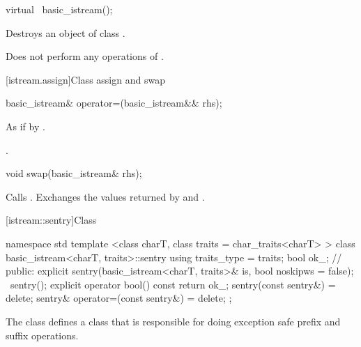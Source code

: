 %
\begin{itemdecl}
virtual ~basic_istream();
\end{itemdecl}

\begin{itemdescr}
\pnum
\effects
Destroys an object of class
.

\pnum
\remarks
Does not perform any operations of
.
\end{itemdescr}

[istream.assign]{Class  assign and swap}

%
\begin{itemdecl}
basic_istream& operator=(basic_istream&& rhs);
\end{itemdecl}

\begin{itemdescr}
\pnum
\effects As if by .

\pnum
\returns {}.
\end{itemdescr}

%
\begin{itemdecl}
void swap(basic_istream& rhs);
\end{itemdecl}

\begin{itemdescr}
\pnum
\effects Calls .
Exchanges the values returned by  and
.
\end{itemdescr}

[istream::sentry]{Class }

%
%
\begin{codeblock}
namespace std {
  template <class charT, class traits = char_traits<charT> >
  class basic_istream<charT, traits>::sentry {
    using traits_type = traits;
    bool ok_; // \expos
  public:
    explicit sentry(basic_istream<charT, traits>& is, bool noskipws = false);
    ~sentry();
    explicit operator bool() const { return ok_; }
    sentry(const sentry&) = delete;
    sentry& operator=(const sentry&) = delete;
  };
}
\end{codeblock}

\begin{itemdescr}
\pnum
The class
defines a class that is responsible for doing exception safe prefix and suffix
operations.
\end{itemdescr}

